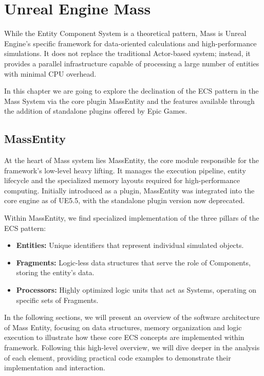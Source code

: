 \chapter{Unreal Engine Mass}
\label{sec:UnrealEngineMass}

While the Entity Component System is a theoretical pattern, Mass is Unreal Engine’s specific framework for data-oriented calculations and high-performance simulations. It does not replace the traditional Actor-based system; instead, it provides a parallel infrastructure capable of processing a large number of entities with minimal CPU overhead.

In this chapter we are going to explore the declination of the ECS pattern in the Mass System via the core plugin MassEntity and the features available through the addition of standalone plugins offered by Epic Games. 

\section[MassEntity]{MassEntity} %

At the heart of Mass system lies MassEntity, the core module responsible for the framework’s low-level heavy lifting. It manages the execution pipeline, entity lifecycle and the specialized memory layouts required for high-performance computing. Initially introduced as a plugin, MassEntity was integrated into the core engine as of UE5.5, with the standalone plugin version now deprecated.

Within MassEntity, we find specialized implementation of the three pillars of the ECS pattern:

\begin{itemize}
    \item \textbf{Entities:} Unique identifiers that represent individual simulated objects.
    \item \textbf{Fragments:} Logic-less data structures that serve the role of Components, storing the entity’s data.
    \item \textbf{Processors:} Highly optimized logic units that act as Systems, operating on specific sets of Fragments.
\end{itemize}

In the following sections, we will present an overview of the software architecture of Mass Entity, focusing on data structures, memory organization and logic execution to illustrate how these core ECS concepts are implemented within framework. Following this high-level overview, we will dive deeper in the analysis of each element, providing practical code examples to demonstrate their implementation and interaction.

